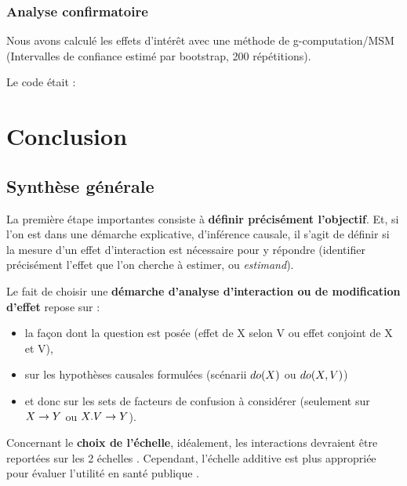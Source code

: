 \documentclass[
]{book}
\providecommand{\tightlist}{%
  \setlength{\itemsep}{0pt}\setlength{\parskip}{0pt}}
\begin{document}
\hypertarget{analyse-confirmatoire-1}{%
\section{Analyse confirmatoire}\label{analyse-confirmatoire-1}}

Nous avons calculé les effets d'intérêt avec une méthode de g-computation/MSM (Intervalles de confiance estimé par bootstrap, 200 répétitions).

Le code était :

\hypertarget{part-conclusion}{%
\part{Conclusion}\label{part-conclusion}}

\hypertarget{synthuxe8se-guxe9nuxe9rale}{%
\chapter{Synthèse générale}\label{synthuxe8se-guxe9nuxe9rale}}

La première étape importantes consiste à \textbf{définir précisément l'objectif}. Et, si l'on est dans une démarche explicative, d'inférence causale, il s'agit de définir si la mesure d'un effet d'interaction est nécessaire pour y répondre (identifier précisément l'effet que l'on cherche à estimer, ou \emph{estimand}).

Le fait de choisir une \textbf{démarche d'analyse d'interaction ou de modification d'effet} repose sur :

\begin{itemize}
\tightlist
\item
  la façon dont la question est posée (effet de X selon V ou effet conjoint de X et V),
\item
  sur les hypothèses causales formulées (scénarii \(\small do(X)\) ou \(\small do(X,V)\))
\item
  et donc sur les sets de facteurs de confusion à considérer (seulement sur \(\small X \rightarrow Y\) ou \(\small X.V \rightarrow Y\)).
\end{itemize}

Concernant le \textbf{choix de l'échelle}, idéalement, les interactions devraient être reportées sur les 2 échelles \citet{knol_recommendations_2012} \citet{vanderweele_tutorial_2014}. Cependant, l'échelle additive est plus appropriée pour évaluer l'utilité en santé publique \citet{vanderweele_tutorial_2014} \citet{knol_recommendations_2012}.
\end{document}
